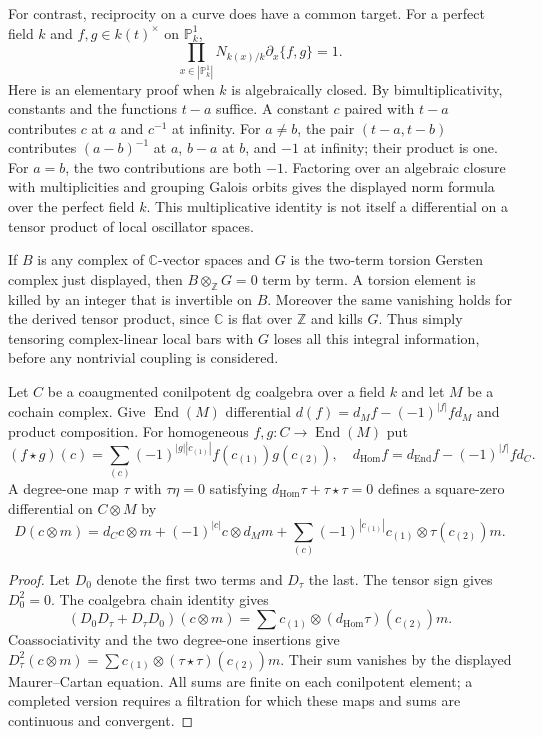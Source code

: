 For contrast, reciprocity on a curve does have a common target.
For a perfect field $k$ and $f,g\in k(t)^\times$ on $\mathbb P^1_k$,
\[
 \prod_{x\in|\mathbb P^1_k|}
       N_{k(x)/k}\partial_x\{f,g\}=1.
\]
Here is an elementary proof when $k$ is algebraically closed.
By bimultiplicativity, constants and the functions $t-a$ suffice.
A constant $c$ paired with $t-a$ contributes $c$ at $a$ and $c^{-1}$ at
infinity.  For $a\ne b$, the pair $(t-a,t-b)$ contributes
$(a-b)^{-1}$ at $a$, $b-a$ at $b$, and $-1$ at infinity; their product is one.
For $a=b$, the two contributions are both $-1$.
Factoring over an algebraic closure with multiplicities and grouping
Galois orbits gives the displayed norm formula over the perfect field $k$.
This multiplicative identity is not itself a differential on a tensor
product of local oscillator spaces.

If $B$ is any complex of $\mathbb C$-vector spaces and $G$ is the two-term
torsion Gersten complex just displayed, then
$B\otimes_{\mathbb Z}G=0$ term by term.  A torsion element is killed by an
integer that is invertible on $B$.
Moreover the same vanishing holds for the derived tensor product, since
$\mathbb C$ is flat over $\mathbb Z$ and kills $G$.
Thus simply tensoring complex-linear local bars with $G$ loses all this
integral information, before any nontrivial coupling is considered.

\begin{proposition}
\label{syn-arith:twisting}
Let $C$ be a coaugmented conilpotent dg coalgebra over a field $k$ and let $M$
be a cochain complex.  Give $\operatorname{End}(M)$ differential
$d(f)=d_Mf-(-1)^{|f|}fd_M$ and product composition.
For homogeneous $f,g:C\to\operatorname{End}(M)$ put
\[
 (f\star g)(c)=\sum_{(c)}(-1)^{|g||c_{(1)}|}
                     f(c_{(1)})g(c_{(2)}),
 \quad d_{\mathrm{Hom}}f=d_{\operatorname{End}}f-(-1)^{|f|}fd_C.
\]
A degree-one map $\tau$ with $\tau\eta=0$ satisfying
$d_{\mathrm{Hom}}\tau+\tau\star\tau=0$ defines a square-zero differential
on $C\otimes M$ by
\[
 D(c\otimes m)=d_Cc\otimes m+(-1)^{|c|}c\otimes d_Mm
       +\sum_{(c)}(-1)^{|c_{(1)}|}c_{(1)}\otimes\tau(c_{(2)})m.
\]
\end{proposition}
\begin{proof}
Let $D_0$ denote the first two terms and $D_\tau$ the last.
The tensor sign gives $D_0^2=0$.  The coalgebra chain identity gives
\[
 (D_0D_\tau+D_\tau D_0)(c\otimes m)
 =\sum c_{(1)}\otimes(d_{\mathrm{Hom}}\tau)(c_{(2)})m.
\]
Coassociativity and the two degree-one insertions give
$D_\tau^2(c\otimes m)=\sum c_{(1)}\otimes(\tau\star\tau)(c_{(2)})m$.
Their sum vanishes by the displayed Maurer--Cartan equation.
All sums are finite on each conilpotent element; a completed version requires
a filtration for which these maps and sums are continuous and convergent.
\end{proof}

